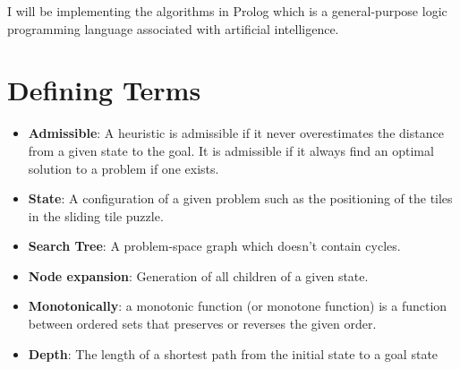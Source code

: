 \documentclass[review]{cmpreport}
\begin{document}
I will be implementing the algorithms in Prolog which is a general-purpose logic programming language associated with artificial intelligence.

\section{Defining Terms}


\begin{itemize}
	\item \textbf{Admissible}: A heuristic is admissible if it never overestimates the distance from a given state to the goal. It is admissible if it always find an optimal solution to a problem if one exists.
	\item \textbf{State}: A configuration of a given problem such as the positioning of the tiles in the sliding tile puzzle.
	\item \textbf{Search Tree}: A problem-space graph which doesn't contain cycles.
	\item \textbf{Node expansion}: Generation of all children of a given state.
    \item \textbf{Monotonically}: a monotonic function (or monotone function) is a function between ordered sets that preserves or reverses the given order.
    \item \textbf{Depth}: The length of a shortest path from the initial state to a goal state
\end{itemize}
\clearpage



\appendix
\clearpage
\end{document}
